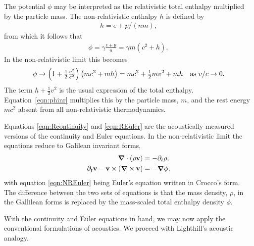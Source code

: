 \documentclass[10pt, fleqn,final,showtrims,oldfontcommands]{article} %
\newcommand{\sub}[1]{\begin{subequations}#1\end{subequations}}
\newcommand{\eqnref}[1]{\ref{eqn:#1}}
\newcommand{\lr}[1]{\left( #1 \right)}
\renewcommand{\d}{\partial}
\newcommand{\del}{\nabla}
\newcommand{\vdel}{ \mbox{\boldmath $\del$}}
\newcommand{\dt}{{\d_t}}
\newcommand{\half}{\tfrac{1}{2}}
\newcommand{\vA}{\textbf{A}}
\newcommand{\vv}{\textbf{v}}
\begin{document}
The potential $\phi$ may be  interpreted as the relativistic  total enthalpy multiplied by the particle mass.
The non-relativistic enthalpy $h$ is defined by
\begin{align}
  h = e + p/(nm),
\end{align}
from which it follows that 
\begin{align}
  \phi =   \gamma\frac{\epsilon + p }{n} = \gamma m\lr{c^2 + h},
\end{align}
In the  non-relativistic limit this becomes
\begin{align}
  \phi \rightarrow \lr{1+\tfrac{1}{2}\tfrac{v^2}{c^2}} \lr{mc^2 + mh} = mc^2 + \tfrac{1}{2}m v^2 + mh \text{\quad as ${v/c\rightarrow 0.}$}
  \label{eqn:phinr}
\end{align}
The term $h + \half v^2$ is the usual expression of the total enthalpy.
Equation~\ref{eqn:phinr} multiplies this by the particle mass, $m$, and the rest energy $mc^2$ absent from all non-relativistic thermodynamics.




Equations \eqnref{Rcontinuity} and \eqnref{REuler} are the acoustically measured versions of the continuity and Euler equations.
In the non-relativistic limit the equations reduce to Galilean invariant forms, 
\sub{
\begin{align}
  \vdel\cdot\lr{\rho \vv}  &= -\dt \rho, \label{eqn:NRcontinuity}\\
  \dt \vv - \vv\times \lr{\vdel\times \vv} &= - \vdel \phi,\label{eqn:NREuler}
\end{align}
}
with 
equation \eqnref{NREuler} being Euler's equation written in Crocco's form\cite{Howe1998}.
The difference between the two sets of equations is that the mass density, $\rho$, in the Gallilean forms is
replaced by the mass-scaled total enthalpy density $\phi$. 

With the continuity and Euler equations in hand,
we may now apply the conventional formulations of acoustics.
We proceed with Lighthill's acoustic analogy\cite{Lighthill1952, Howe1998}.
\end{document}
